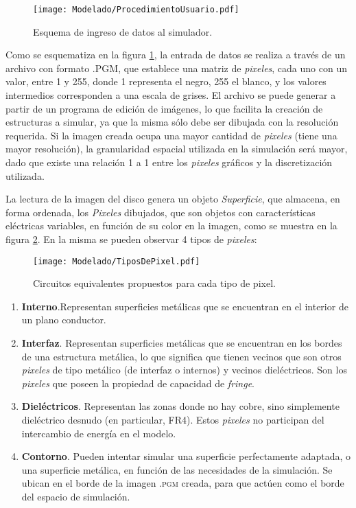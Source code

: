 \begin{figure}[h]
	\centering
	\texttt{[image: Modelado/ProcedimientoUsuario.pdf]}
	\caption{Esquema de ingreso de datos al simulador.}
	\label{fig:esquema-ingreso-datos}
\end{figure}

Como se esquematiza en la figura \ref{fig:esquema-ingreso-datos}, la entrada de datos se realiza a través de un archivo con formato \textsc{.PGM}, que establece una matriz de \textit{pixeles}, cada uno con un valor, entre 1 y 255, donde 1 representa el negro, 255 el blanco, y los valores intermedios corresponden a una escala de grises. El archivo se puede generar a partir de un programa de edición de imágenes, lo que facilita la creación de estructuras a simular, ya que la misma sólo debe ser dibujada con la resolución requerida. Si la imagen creada ocupa una mayor cantidad de \textit{pixeles} (tiene una mayor resolución), la granularidad espacial utilizada en la simulación será mayor, dado que existe una relación 1 a 1 entre los \textit{pixeles} gráficos y la discretización utilizada.

La lectura de la imagen del disco genera un objeto \textit{Superficie}, que almacena, en forma ordenada, los \textit{Pixeles} dibujados, que son objetos con características eléctricas variables, en función de su color en la imagen, como se muestra en la figura \ref{fig:tiposdepixeles}. En la misma se pueden observar 4 tipos de \textit{pixeles}:

\begin{figure}[h]
	\centering
	\texttt{[image: Modelado/TiposDePixel.pdf]}
	\caption{Circuitos equivalentes propuestos para cada tipo de pixel.}
	\label{fig:tiposdepixeles}
\end{figure}

\begin{enumerate}
	\item \textbf{Interno}.Representan superficies metálicas que se encuentran en el interior de un plano conductor.
	\item \textbf{Interfaz}. Representan superficies metálicas que se encuentran en los bordes de una estructura metálica, lo que significa que tienen vecinos que son otros \textit{pixeles} de tipo metálico (de interfaz o internos) y vecinos dieléctricos. Son los \textit{pixeles} que poseen la propiedad de capacidad de \textit{fringe}.
	\item \textbf{Dieléctricos}. Representan las zonas donde no hay cobre, sino simplemente dieléctrico desnudo (en particular, FR4). Estos \textit{pixeles} no participan del intercambio de energía en el modelo.
	\item \textbf{Contorno}. Pueden intentar simular una superficie perfectamente adaptada, o una superficie metálica, en función de las necesidades de la simulación. Se ubican en el borde de la imagen \textsc{.pgm} creada, para que actúen como el borde del espacio de simulación.
\end{enumerate}



